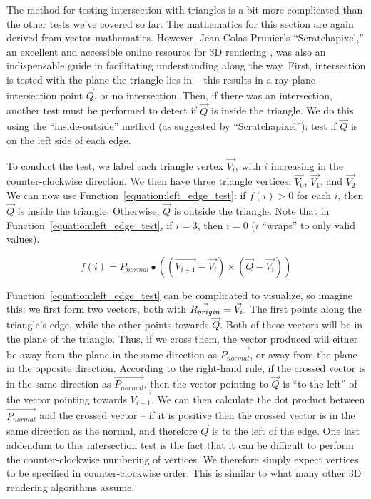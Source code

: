 
The method for testing intersection with triangles is a bit more complicated than the other tests we've covered so far.
The mathematics for this section are again derived from vector mathematics.
However, Jean-Colas Prunier's ``Scratchapixel,'' an excellent and accessible online resource for 3D rendering \cite{prunier2017triangle}, was also an indispensable guide in facilitating understanding along the way.
First, intersection is tested with the plane the triangle lies in -- this results in a ray-plane intersection point $\vec{Q}$, or no intersection.
Then, if there was an intersection, another test must be performed to detect if $\vec{Q}$ is inside the triangle.
We do this using the ``inside-outside'' method (as suggested by ``Scratchapixel''): test if $\vec{Q}$ is on the left side of each edge.

To conduct the test, we label each triangle vertex $\vec{V_i}$, with $i$ increasing in the counter-clockwise direction.
We then have three triangle vertices: $\vec{V_0}$, $\vec{V_1}$, and $\vec{V_2}$.
We can now use Function~\ref{equation:left_edge_test}: if $f(i) > 0$ for each $i$, then $\vec{Q}$ is inside the triangle.
Otherwise, $\vec{Q}$ is outside the triangle.
Note that in Function~\ref{equation:left_edge_test}, if $i = 3$, then $i = 0$ ($i$ ``wraps'' to only valid values).

\begin{equation}
  \label{equation:left_edge_test}
  f(i) = P_{normal} \bullet ((\vec{V_{i+1}} - \vec{V_i}) \times (\vec{Q} - \vec{V_i}))
\end{equation}

Function~\ref{equation:left_edge_test} can be complicated to visualize, so imagine this: we first form two vectors, both with $\vec{R_{origin}} = \vec{V_i}$.
The first points along the triangle's edge, while the other points towards $\vec{Q}$.
Both of these vectors will be in the plane of the triangle.
Thus, if we cross them, the vector produced will either be away from the plane in the same direction as $\vec{P_{normal}}$, or away from the plane in the opposite direction.
According to the right-hand rule, if the crossed vector is in the same direction as $\vec{P_{normal}}$, then the vector pointing to $\vec{Q}$ is ``to the left'' of the vector pointing towards $\vec{V_{i+1}}$.
We can then calculate the dot product between $\vec{P_{normal}}$ and the crossed vector -- if it is positive then the crossed vector is in the same direction as the normal, and therefore $\vec{Q}$ is to the left of the edge.
One last addendum to this intersection test is the fact that it can be difficult to perform the counter-clockwise numbering of vertices.
We therefore simply expect vertices to be specified in counter-clockwise order.
This is similar to what many other 3D rendering algorithms assume.


